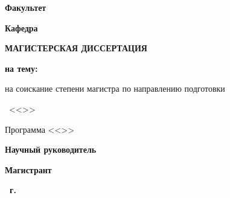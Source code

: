 \thispagestyle{empty}%
\begin{center}%
\textbf{\thesisOrganization}
\end{center}%
%
\vspace{0pt plus4fill} %
%
\vspace{0pt plus6fill} %
%
\begin{flushleft}
\textbf{Факультет} \underline{\faculty}

\textbf{Кафедра} \underline{\department}
\end{flushleft}
%
\vspace{0pt plus4fill}
%
\begin{center}%
{
\textbf{\large{МАГИСТЕРСКАЯ ДИССЕРТАЦИЯ}}

\vspace{0pt plus2fill}

\textbf{на тему:}

\vspace{0pt plus2fill}

\thesisTitle

\vspace{0pt plus1fill}

на соискание степени магистра по направлению подготовки

\thesisSpecialtyNumber\ <<\thesisSpecialtyTitle>>


\vspace{0pt plus1fill}

Программа <<\thesisSpecialtyProgram>>
}
%
\end{center}%
%
\vspace{0pt plus4fill}
\begin{flushright}%
\textbf{Научный руководитель} \supervisorRegalia

\supervisorFioShort

\underline{\hspace{3cm}}

\textbf{Магистрант} \thesisAuthorGroup

\thesisAuthorShort

\underline{\hspace{3cm}}

\end{flushright}%

\vspace{0pt plus4fill}
\begin{center}%
\textbf{\thesisCity\ \thesisYear г.}
\end{center}%
\newpage

